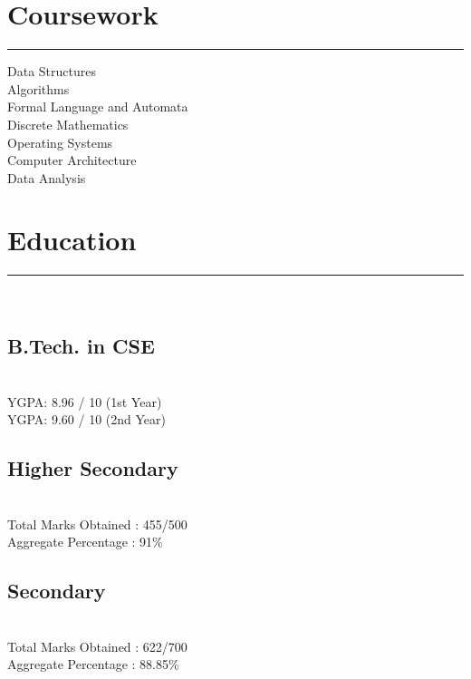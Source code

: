 \documentclass[]{debjitpal-resume}
\begin{document}
\begin{minipage}[t]{0.35\textwidth}
\section{Coursework}
\noindent\rule{5cm}{0.4pt}

Data Structures\\
Algorithms\\
Formal Language and Automata \\
Discrete Mathematics\\
Operating Systems\\
Computer Architecture\\
Data Analysis
\sectionsep
\section{Education} 
\noindent\rule{5cm}{0.4pt}\\
\subsection{B.Tech. in CSE}
 \\
YGPA: 8.96 / 10 (1st Year)\\
YGPA: 9.60 / 10 (2nd Year)\\
\vspace{8pt}
\subsection{Higher Secondary}
\\
Total Marks Obtained : 455/500 \\
Aggregate Percentage : 91\%\\
\vspace{8pt}
\subsection{Secondary}
\\
Total Marks Obtained : 622/700 \\
Aggregate Percentage : 88.85\%
\sectionsep
%
%
\end{minipage} 
\hfill
\end{document}
